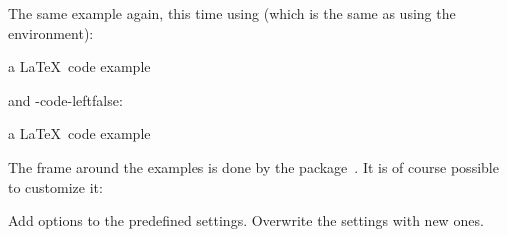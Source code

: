 \documentclass[load-preamble+,babel-options={ngerman,english}]{cnltx-doc}
\begin{document}
The same example again, this time using   (which is the
same as using the  environment):

\begin{example}
  a \LaTeX\ code example
\end{example}

 and \keyis-{code-left}{false}:

\begin{example}[side-by-side,code-left=false]
  a \LaTeX\ code example
\end{example}

The frame around the examples is done by the
 package~\cite{pkg:mdframed}.  It is of course possible to
customize it:
\begin{options}
  \Default
    Add options to the predefined settings.
    Overwrite the settings with new ones.
\end{options}
\end{document}

